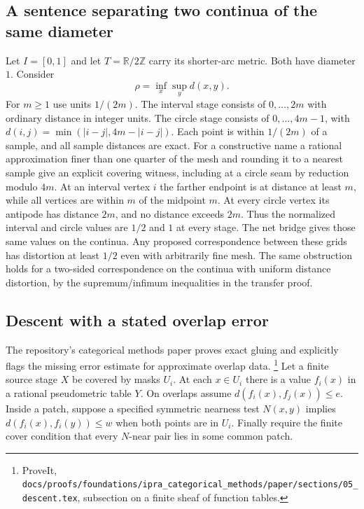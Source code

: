 \subsection{A sentence separating two continua of the same diameter}

Let $I=[0,1]$ and let $T=\mathbb R/2\mathbb Z$ carry its shorter-arc
metric. Both have diameter $1$. Consider
\[
                    \rho=\inf_x\sup_y d(x,y).
\]
For $m\geq1$ use units $1/(2m)$. The interval stage consists of
$0,\ldots,2m$ with ordinary distance in integer units. The circle stage
consists of $0,\ldots,4m-1$, with
$d(i,j)=\min(|i-j|,4m-|i-j|)$. Each point is within $1/(2m)$ of a
sample, and all sample distances are exact. For a constructive name
a rational approximation finer than one quarter of the mesh and rounding
it to a nearest sample give an explicit covering witness, including at a
circle seam by reduction modulo $4m$.
At an interval vertex $i$ the farther endpoint is at distance at least
$m$, while all vertices are within $m$ of the midpoint $m$.
At every circle vertex its antipode has distance $2m$, and no distance
exceeds $2m$. Thus the normalized interval and circle values are
$1/2$ and $1$ at every stage. The net bridge gives those same values
on the continua. Any proposed correspondence between these grids has
distortion at least $1/2$ even with arbitrarily fine mesh. The same
obstruction holds for a two-sided correspondence on the continua with
uniform distance distortion, by the supremum/infimum inequalities in
the transfer proof.

\subsection{Descent with a stated overlap error}

The repository's categorical methods paper proves exact gluing and
explicitly flags the missing error estimate for approximate overlap
data.%
\footnote{ProveIt, \nolinkurl{docs/proofs/foundations/ipra_categorical_methods/paper/sections/05_descent.tex},
subsection on a finite sheaf of function tables.}
Let a finite source stage $X$ be covered by masks $U_i$.
At each $x\in U_i$ there is a value $f_i(x)$ in a rational
pseudometric table $Y$. On overlaps assume
$d(f_i(x),f_j(x))\leq e$. Inside a patch, suppose a specified symmetric
nearness test $N(x,y)$ implies $d(f_i(x),f_i(y))\leq w$
when both points are in $U_i$. Finally require the finite cover
condition that every $N$-near pair lies in some common patch.

